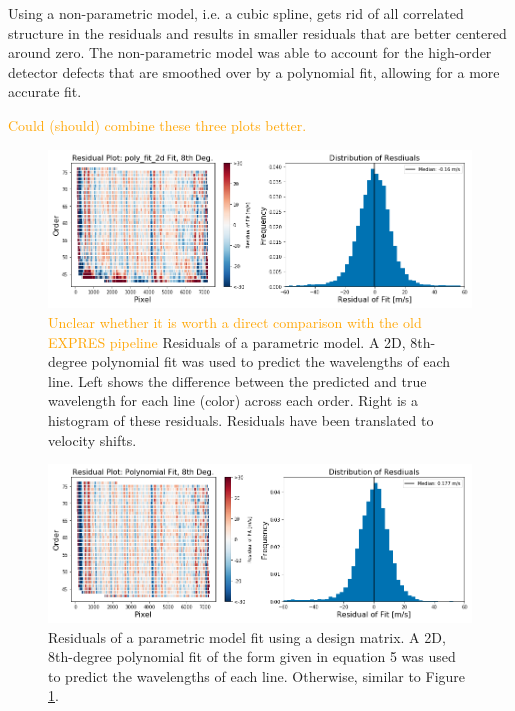 \documentclass[12pt, letterpaper]{article}
\newcommand{\lz}[1]{\textcolor{orange}{#1}}
\begin{document}
Using a non-parametric model, i.e. a cubic spline, gets rid of all correlated structure in the residuals and results in smaller residuals that are better centered around zero.  The non-parametric model was able to account for the high-order detector defects that are smoothed over by a polynomial fit, allowing for a more accurate fit.

\lz{Could (should) combine these three plots better.}

\begin{figure}[h]
\centering
\includegraphics[width=\textwidth]{Figures/polyval2d.png}
\caption{\lz{Unclear whether it is worth a direct comparison with the old EXPRES pipeline} Residuals of a parametric model.  A 2D, 8th-degree polynomial fit was used to predict the wavelengths of each line.   Left shows the difference between the predicted and true wavelength for each line (color) across each order.  Right is a histogram of these residuals.  Residuals have been translated to velocity shifts.}
\label{fig:polyValFit}
\end{figure} 

\begin{figure}[h]
\centering
\includegraphics[width=\textwidth]{Figures/designMatrix.png}
\caption{Residuals of a parametric model fit using a design matrix.  A 2D, 8th-degree polynomial fit of the form given in equation 5 was used to predict the wavelengths of each line.  Otherwise, similar to Figure \ref{fig:polyValFit}.}
\label{fig:dsnMFit}
\end{figure} 
\end{document}

